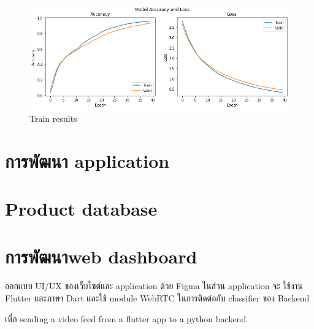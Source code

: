 \begin{figure}[h]
  \begin{center}
  \includegraphics[scale=0.45]{pic/train.png}
  \end{center}
  
  \caption[Train results]{Train results}
  \label{fig:Train results}
  \end{figure}


\newpage

\section{การพัฒนา application }


\section{Product database }

\section{การพัฒนาweb dashboard }

ออกแบบ UI/UX ของเว็บไซต์และ application ด้วย Figma
ในส่วน application จะ  ใช้งาน Flutter และภาษา Dart และใช้ module  WebRTC ในการติดต่อกับ classifier ของ Backend

เพื่อ  sending a video feed from a flutter app to a python backend

 
